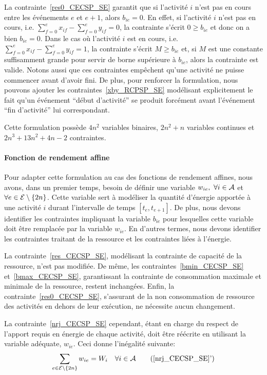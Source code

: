 La contrainte~\eqref{res0_CECSP_SE} garantit que si l'activité $i$
n'est pas en cours entre les événements $e$ et $e+1$, alors
$b_{ie}=0$. En effet, si l'activité $i$ n'est pas en cours,
i.e. $\sum_{f=0}^{e} x_{if}-\sum_{f=0}^{e}y_{if}=0$, la contrainte
s'écrit $0\ge b_{ie}$ et donc on a bien $b_{ie} =0$. Dans le cas où
l'activité $i$ est en cours, i.e. $\sum_{f=0}^{e} x_{if}
-\sum_{f=0}^{e}y_{if}=1$, la contrainte s'écrit $M\ge b_{ie}$ et, si
$M$ est une constante suffisamment grande pour servir de borne
supérieure à $b_{ie}$, alors la contrainte est valide. Notons aussi
que ces contraintes empêchent qu'une activité ne puisse commencer
avant d'avoir fini. De plus, pour renforcer la formulation, nous
pouvons ajouter les contraintes~\eqref{xby_RCPSP_SE} modélisant
explicitement le fait qu'un événement ``début d'activité'' se produit
forcément avant l'événement ``fin d'activité'' lui
correspondant. 

Cette formulation possède $4n^2$ variables binaires, $2n^2+n$
variables continues et $2n^3+13n^2+4n-2$ contraintes.

\paragraph{Fonction de rendement affine}

Pour adapter cette formulation au cas des fonctions de rendement
affines, nous avons, dans un premier temps, besoin de définir une
variable $w_{ie},\ \forall i \in {\cal A}$ et $\forall e \in {\cal E}
\setminus\{2n\}$. Cette variable sert à modéliser la quantité
d'énergie apportée à une activité $i$ durant l'intervalle de temps
$[t_e,t_{e+1}]$. De plus, nous devons identifier les contraintes
impliquant la variable $b_{ie}$ pour lesquelles cette variable doit
être remplacée par la variable $w_{ie}$. En d'autres termes, nous
devons identifier les contraintes traitant de la ressource et les
contraintes liées à l'énergie.

La contrainte~\eqref{res_CECSP_SE}, modélisant la contrainte de
capacité de la ressource, n'est pas modifiée. De même, les
contraintes~\eqref{bmin_CECSP_SE} et~\eqref{bmax_CECSP_SE},
garantissant la contrainte de consommation maximale et minimale de la
ressource, restent inchangées. Enfin, la
contrainte~\eqref{res0_CECSP_SE}, s'assurant de la non consommation de
ressource des activités en dehors de leur exécution, ne nécessite
aucun changement.

La contrainte~\eqref{nrj_CECSP_SE} cependant, étant en charge du
respect de l'apport requis en énergie de chaque activité, doit être
réécrite en utilisant la variable adéquate, $w_{ie}$. Ceci donne
l'inégalité suivante:
\begin{equation} 
\sum_{e\in \E\setminus\{2n\}} w_{ie} = W_i\quad \forall i \in \A
\tag{\ref{nrj_CECSP_SE}'}
\label{nrj2_CECSP_SE}
\end{equation} 

